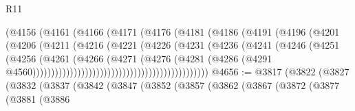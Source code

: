 \begin{lexlean}{R11}
\begin{coremodule}
{{{{{{{{{{{{{{{{{{{{{{{{{{{{{{{{{{{{{{{{{{{{{{{{{{{{{{{{{{{{{{{{{{{{{{{{{{{{{{{{{{                                          (@4156
                                            (@4161
                                              (@4166
                                                (@4171
                                                  (@4176
                                                    (@4181
                                                      (@4186
                                                        (@4191
                                                          (@4196
                                                            (@4201
                                                              (@4206
                                                                (@4211
                                                                  (@4216
                                                                    (@4221
                                                                      (@4226
                                                                        (@4231
                                                                          (@4236
                                                                            (@4241
                                                                              (@4246
                                                                                (@4251
                                                                                  (@4256
                                                                                    (@4261
                                                                                      (@4266
                                                                                        (@4271
                                                                                          (@4276
                                                                                            (@4281
                                                                                              (@4286
                                                                                                (@4291
                                                                                                  @4560)))))))))))))))))))))))))))))))))))))))))))))))
@4656 := @3817
    (@3822
      (@3827
        (@3832
          (@3837
            (@3842
              (@3847
                (@3852
                  (@3857
                    (@3862
                      (@3867
                        (@3872
                          (@3877
                            (@3881
                              (@3886
}}}}}}}}}}}}}}}}}}}}}}}}}}}}}}}}}}}}}}}}}}}}}}}}}}}}}}}}}}}}}}}}}}}}}}}}}}}}}}}}}}
\end{coremodule}
\end{lexlean}
